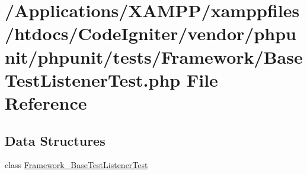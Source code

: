 \hypertarget{_base_test_listener_test_8php}{}\section{/\+Applications/\+X\+A\+M\+P\+P/xamppfiles/htdocs/\+Code\+Igniter/vendor/phpunit/phpunit/tests/\+Framework/\+Base\+Test\+Listener\+Test.php File Reference}
\label{_base_test_listener_test_8php}
\subsection*{Data Structures}
\begin{DoxyCompactItemize}
\item 
class \mbox{\hyperlink{class_framework___base_test_listener_test}{Framework\+\_\+\+Base\+Test\+Listener\+Test}}
\end{DoxyCompactItemize}
